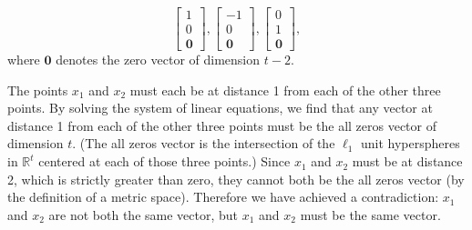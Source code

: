 \documentclass{article}
\newcommand{\R}{\mathbb{R}}
\newcommand{\1}{\mathbf{1}}
\newcommand{\0}{\mathbf{0}}
\begin{document}
\begin{enumerate}
\begin{enumerate}
    \begin{equation*}
      \begin{bmatrix}
        1 \\ 0 \\ \0
      \end{bmatrix},
      \begin{bmatrix}
        -1 \\ 0 \\ \0
      \end{bmatrix},
      \begin{bmatrix}
        0 \\ 1 \\ \0
      \end{bmatrix},
    \end{equation*}
    where $\0$ denotes the zero vector of dimension $t - 2$.

    The points $x_1$ and $x_2$ must each be at distance 1 from each of the other three points.
    By solving the system of linear equations, we find that any vector at distance 1 from each of the other three points must be the all zeros vector of dimension $t$.
    (The all zeros vector is the intersection of the $\ell_1$ unit hyperspheres in $\R^t$ centered at each of those three points.)
    Since $x_1$ and $x_2$ must be at distance 2, which is strictly greater than zero, they cannot both be the all zeros vector (by the definition of a metric space).
    Therefore we have achieved a contradiction: $x_1$ and $x_2$ are not both the same vector, but $x_1$ and $x_2$ must be the same vector.


\end{enumerate}
\end{enumerate}
\end{document}
